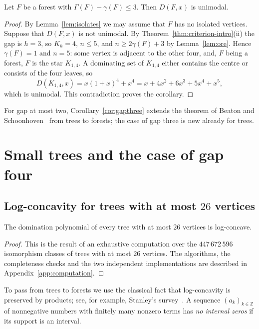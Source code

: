 \documentclass[smallextended,envcountsect,envcountsame]{svjour3}
\newcommand{\MaxLC}{26}
\newcommand{\TotalTreesLC}{447\,672\,596}
\begin{document}
\begin{corollary}\label{cor:gapthree}
Let $F$ be a forest with $\Gamma(F)-\gamma(F)\le3$. Then $D(F,x)$ is
unimodal.
\end{corollary}

\begin{proof}
By Lemma~\ref{lem:isolates} we may assume that $F$ has no isolated vertices.
Suppose that $D(F,x)$ is not unimodal. By
Theorem~\ref{thm:criterion-intro}(ii) the gap is $h=3$, so $K_h=4$,
$n\le5$, and $n\ge2\gamma(F)+3$ by Lemma~\ref{lem:ore}. Hence $\gamma(F)=1$
and $n=5$: some vertex is adjacent to the other four, and, $F$ being a
forest, $F$ is the star $K_{1,4}$. A dominating set of $K_{1,4}$ either
contains the centre or consists of the four leaves, so
\begingroup\small\[
  D(K_{1,4},x)=x(1+x)^4+x^4=x+4x^2+6x^3+5x^4+x^5 ,
\]\endgroup
which is unimodal. This contradiction proves the corollary.
\end{proof}

For gap at most two, Corollary~\ref{cor:gapthree} extends the theorem of
Beaton and Schoonhoven~\cite[Corollary~17]{BS} from trees to forests; the case
of gap three is new already for trees.

\section{Small trees and the case of gap four}\label{sec:small}

\subsection{Log-concavity for trees with at most \texorpdfstring{$\MaxLC$}{26} vertices}

\begin{theorem}\label{thm:small}
The domination polynomial of every tree with at most $\MaxLC$ vertices is
log-concave.
\end{theorem}

\begin{proof}
This is the result of an exhaustive computation over the $\TotalTreesLC$
isomorphism classes of trees with at most $\MaxLC$ vertices. The algorithms,
the completeness checks and the two independent implementations are described
in Appendix~\ref{app:computation}.
\end{proof}

To pass from trees to forests we use the classical fact that log-concavity is
preserved by products; see, for example, Stanley's survey~\cite{Stanley}. A
sequence $(a_k)_{k\in\mathbb Z}$ of nonnegative numbers with finitely many
nonzero terms has \emph{no internal zeros} if its support is an interval.
\end{document}
